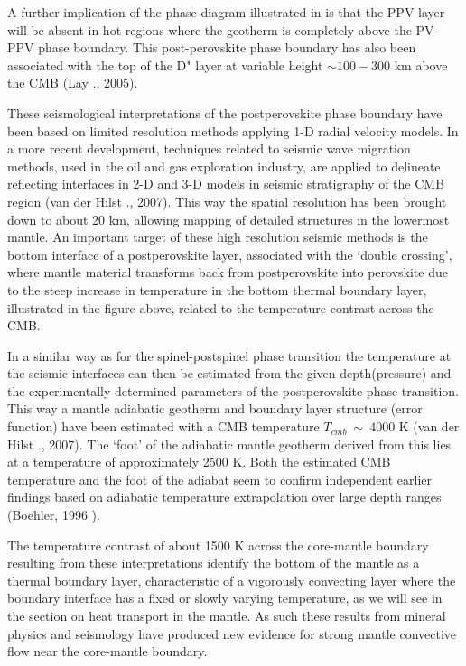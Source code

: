 A further implication of the phase diagram illustrated in 
is that the PPV layer will be absent in hot regions where the
geotherm is completely above the PV-PPV phase boundary.
This post-perovskite phase boundary has also been associated with the 
top of the D" layer at variable height $\sim 100-300$ km above the CMB
(Lay \etal., 2005).


These seismological interpretations of the postperovskite 
phase boundary have been based on limited resolution methods applying
1-D radial velocity models.
In a more recent development, techniques related to seismic wave
migration methods, used in the oil and gas exploration industry,
are applied to delineate reflecting interfaces in 2-D and 3-D models
in seismic stratigraphy of the CMB region (van der Hilst \etal., 2007).
This way the spatial resolution has been brought down to about 20 km,
allowing mapping of detailed  structures in the lowermost mantle.
An important target of these high resolution seismic methods is 
the bottom interface of a postperovskite layer,
associated with the `double crossing', where mantle material 
transforms back from postperovskite into perovskite due to the steep 
increase in temperature in the bottom thermal boundary layer, 
illustrated in the figure above,
related to the temperature contrast across the CMB.

In a similar way as for the spinel-postspinel phase transition
the temperature  at the seismic interfaces can then be estimated
from the given depth(pressure) and the experimentally determined
parameters of the postperovskite phase transition.
This way a mantle adiabatic geotherm and boundary 
layer structure (error function) have been estimated with a CMB
temperature $T_{cmb}~\sim~ 4000$ K (van der Hilst \etal., 2007).
The `foot' of the adiabatic mantle geotherm derived from this
lies at a temperature of approximately 2500 K.
Both the estimated CMB temperature and the foot of the adiabat
seem to confirm independent earlier findings based on adiabatic
temperature extrapolation over large depth ranges (Boehler, 1996 \cite{boeh96}). 

The temperature contrast of about 1500 K across the core-mantle
boundary resulting from these interpretations identify the
bottom of the mantle as a thermal boundary layer,
characteristic of a vigorously convecting layer where the boundary
interface has a fixed or slowly varying temperature,
as we will see in the section on heat transport in the mantle.
As such these results from mineral physics and seismology have
produced new evidence for strong mantle convective flow near the
core-mantle boundary.
